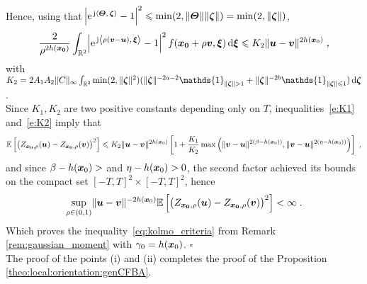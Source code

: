 \documentclass{elsarticle}
\begin{document}
Hence, using that $\abs{\mathrm{e}^{\, \mathrm{j} \left \langle \bm{\Theta},\, \bm{\zeta}\right \rangle}-1}^2\leqslant \min(2,\lVert \bm{\Theta}\rVert \lVert \bm{\zeta}\rVert)=\min(2,\lVert \bm{\zeta}\rVert)$,
\begin{equation}\label{e:K2}
\frac{2}{\rho^{2h(\bm{x_0})}} \int_{ \mathbb{R}^2} \abs{\mathrm{e}^{\, \mathrm{j} \left \langle \rho (\bm{v}-\bm{u}),\, \bm{\xi}\right \rangle}-1}^2 f(\bm{x_0}+\rho \bm{v},\bm{\xi})\mathop{}\mathopen{}\mathrm{d} \bm{\xi}
\leqslant K_2\|\bm{u}-\bm{v}\|^{2h(\bm{x}_0)}\;,
\end{equation}
with $K_2=2A_1A_2\|C\|_\infty\int_{ \mathbb{R}^2} \min(2,\|\vect{\zeta}\|^2)(\|\vect{\zeta}\|^{-2a-2} \mathds{1}_{\|\vect{\zeta}\|>1}+\|\vect{\zeta}\|^{-2b} \mathds{1}_{\|\vect{\zeta}\|\leq 1})\diff \vect{\zeta}$.\\

Since $K_1,K_2$ are two positive constants depending only on $T$, inequalities~\eqref{e:K1} and~\eqref{e:K2} imply that
\[
\mathbb{E}\left[\left(Z_{\bm{x_0},\rho}(\bm{u})-Z_{\bm{x_0},\rho}(\bm{v})\right)^2\right]\leqslant K_2 \lVert \bm{u}-\bm{v}\rVert^{2h(\bm{x}_0)}\left[1+\frac{K_1}{K_2} \max\left(\|\bm{v}-\bm{u}\|^{2(\beta-h(\bm{x}_0))},\|\bm{v}-\bm{u}\|^{2(\eta-h(\bm{x}_0))}\right)\right]\;,
\]
and since $\beta-h(\bm{x}_0)>$ and $\eta-h(\bm{x}_0)>0$, the second factor achieved its bounds on the compact set $[-T,T]^2\times [-T,T]^2$, hence
\[
\sup_{\rho\in (0,1)}\lVert \bm{u}-\bm{v}\rVert^{-2h(\bm{x}_0)}\mathbb{E}\left[\left(Z_{\bm{x_0},\rho}(\bm{u})-Z_{\bm{x_0},\rho}(\bm{v})\right)^2\right]<\infty\;.
\]
Which proves the inequality~\eqref{eq:kolmo_criteria} from Remark \ref{rem:gaussian_moment} with $\gamma_0=h(\bm{x}_0)$. \hfill $\square$\\

\noindent The proof of the points (i) and (ii) completes the proof of the Proposition \ref{theo:local:orientation:genCFBA}.
\end{document}
